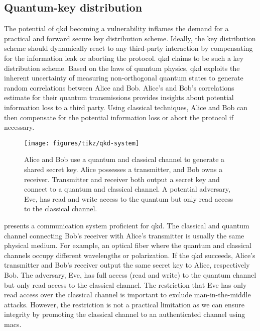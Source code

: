 \FloatBarrier
\subsection{Quantum-key distribution}

The potential of \gls{qkd} becoming a vulnerability inflames the demand for a practical and forward secure key distribution scheme.
Ideally, the key distribution scheme should dynamically react to any third-party interaction by compensating for the information leak or aborting the protocol.
\gls{qkd} claims to be such a key distribution scheme.
Based on the laws of quantum physics, \gls{qkd} exploits the inherent uncertainty of measuring non-orthogonal quantum states to generate random correlations between Alice and Bob.
Alice's and Bob's correlations estimate for their quantum transmissions provides insights about potential information loss to a third party.
Using classical techniques, Alice and Bob can then compensate for the potential information loss or abort the protocol if necessary.
\begin{figure}[htb]
	\centering
	\texttt{[image: figures/tikz/qkd-system]}
	\caption{Alice and Bob use a quantum and classical channel to generate a shared secret key. Alice possesses a transmitter, and Bob owns a receiver. Transmitter and receiver both output a secret key and connect to a quantum and classical channel. A potential adversary, Eve, has read and write access to the quantum but only read access to the classical channel.}\label{fig:qkd_system}
\end{figure}
 presents a communication system proficient for \gls{qkd}.
The classical and quantum channel connecting Bob's receiver with Alice's transmitter is usually the same physical medium.
For example, an optical fiber where the quantum and classical channels occupy different wavelengths or polarization.
If the \gls{qkd} succeeds, Alice's transmitter and Bob's receiver output the same secret key to Alice, respectively Bob.
The adversary, Eve, has full access (read and write) to the quantum channel but only read access to the classical channel.
The restriction that Eve has only read access over the classical channel is important to exclude man-in-the-middle attacks.
However, the restriction is not a practical limitation as we can ensure integrity by promoting the classical channel to an authenticated channel using \gls{mac}s.

